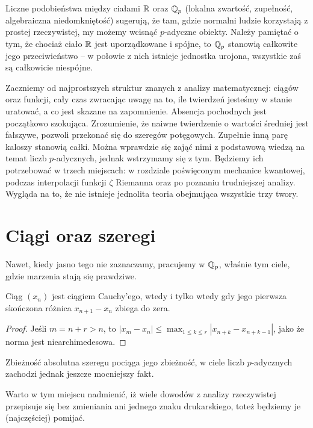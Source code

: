 Liczne podobieństwa między ciałami $\mathbb R$ oraz $\mathbb Q_p$ (lokalna zwartość, zupełność, algebraiczna niedomkniętość) sugerują, że tam, gdzie normalni ludzie korzystają z prostej rzeczywistej, my możemy wcisnąć $p$-adyczne obiekty.
Należy pamiętać o tym, że chociaż ciało $\mathbb R$ jest uporządkowane i spójne, to $\mathbb Q_p$ stanowią całkowite jego przeciwieństwo -- w połowie z nich istnieje jednostka urojona, wszystkie zaś są całkowicie niespójne.

Zaczniemy od najprostszych struktur znanych z analizy matematycznej: ciągów oraz funkcji, cały czas zwracając uwagę na to, ile twierdzeń jesteśmy w stanie uratować, a co jest skazane na zapomnienie.
Absencja pochodnych jest początkowo szokująca.
Zrozumienie, że naiwne twierdzenie o wartości średniej jest fałszywe, pozwoli przekonać się do szeregów potęgowych.
Zupełnie inną parę kaloszy stanowią całki.
Można wprawdzie się zająć nimi z podstawową wiedzą na temat liczb $p$-adycznych, jednak wstrzymamy się z tym.
Będziemy ich potrzebować w trzech miejscach: w rozdziale poświęconym mechanice kwantowej, podczas interpolacji funkcji $\zeta$ Riemanna oraz po poznaniu trudniejszej analizy.
Wygląda na to, że nie istnieje jednolita teoria obejmująca wszystkie trzy twory.

\section{Ciągi oraz szeregi}
Nawet,  kiedy jasno tego nie zaznaczamy, pracujemy w $\mathbb Q_p$, właśnie tym ciele, gdzie marzenia stają się prawdziwe.

\begin{fakt}
	Ciąg $(x_n)$ jest ciągiem Cauchy'ego, wtedy i tylko wtedy gdy jego pierwsza skończona różnica $x_{n+1} - x_n$ zbiega do zera.
\end{fakt}

\begin{proof}
	Jeśli $m = n+r > n$, to $|x_m - x_n| \le \max_{1 \le k \le r} |x_{n+k}-x_{n+k-1}|$, jako że norma jest niearchimedesowa.
\end{proof}

Zbieżność absolutna szeregu pociąga jego zbieżność, w ciele liczb $p$-adycznych zachodzi jednak jeszcze mocniejszy fakt.

Warto w tym miejscu nadmienić, iż wiele dowodów z analizy rzeczywistej przepisuje się bez zmieniania ani jednego znaku drukarskiego, toteż będziemy je (najczęściej) pomijać.

